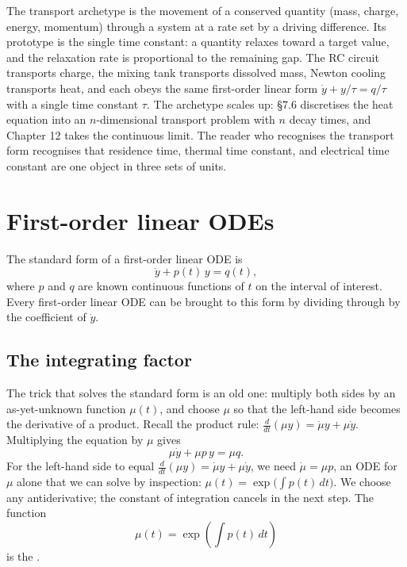\begin{archetype}
The transport archetype is the movement of a conserved quantity
(mass, charge, energy, momentum) through a system at a rate set by a
driving difference. Its prototype is the single time constant: a
quantity relaxes toward a target value, and the relaxation rate is
proportional to the remaining gap. The RC circuit transports charge,
the mixing tank transports dissolved mass, Newton cooling transports
heat, and each obeys the same first-order linear form
$\dot{y} + y/\tau = q/\tau$ with a single time constant $\tau$. The
archetype scales up: \S7.6 discretises the heat equation into an
$n$-dimensional transport problem with $n$ decay times, and Chapter
12 takes the continuous limit. The reader who recognises the
transport form recognises that residence time, thermal time
constant, and electrical time constant are one object in three sets
of units.
\end{archetype}

\section{First-order linear ODEs}

The standard form of a first-order linear ODE is
\[
\dot{y} + p(t)\, y = q(t),
\]
where $p$ and $q$ are known continuous functions of $t$ on the
interval of interest. Every first-order linear ODE can be brought
to this form by dividing through by the coefficient of $\dot{y}$.

\subsection{The integrating factor}

The trick that solves the standard form is an old one: multiply
both sides by an as-yet-unknown function $\mu(t)$, and choose $\mu$
so that the left-hand side becomes the derivative of a product.
Recall the product rule: $\frac{d}{dt}(\mu y) = \dot{\mu} y + \mu
\dot{y}$. Multiplying the equation by $\mu$ gives
\[
\mu \dot{y} + \mu p\, y = \mu q.
\]
For the left-hand side to equal $\frac{d}{dt}(\mu y) = \dot{\mu} y +
\mu \dot{y}$, we need $\dot{\mu} = \mu p$, an ODE for $\mu$ alone
that we can solve by inspection: $\mu(t) = \exp\bigl(\int p(t)\,dt\bigr)$.
We choose any antiderivative; the constant of integration cancels
in the next step. The function
\[
\mu(t) = \exp\!\left(\int p(t)\,dt\right)
\]
is the .

